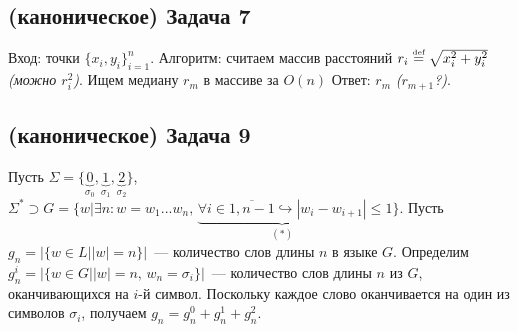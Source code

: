 \documentclass[a4paper]{article}
\def\eqdef{\overset{\mbox{\tiny def}}{=}}
\begin{document}
\subsection*{(каноническое) Задача 7}
Вход: точки $\{x_i,y_i\}_{i=1}^n$.\newline
Алгоритм: считаем массив расстояний $r_i\eqdef \sqrt{x_i^2+y_i^2}$ {\em (можно $r_i^2$)}. Ищем медиану $r_m$ в массиве за $O(n)$\newline
Ответ: $r_{m}$ {\em ($r_{m+1}$?)}.
\subsection*{(каноническое) Задача 9}
Пусть $\Sigma=\{\underbrace{0}_{\sigma_0},\underbrace{1}_{\sigma_1},\underbrace{2}_{\sigma_2}\}$, $\Sigma^*\supset G=\{w\big|\exists n\colon w=w_1...w_n,\,\underbrace{\forall i\in\overline{1,n-1}\hookrightarrow |w_i-w_{i+1}|}_{(*)}\leqslant 1\}$. Пусть $g_n=|\{w\in L\big||w|=n\}|$~--- количество слов длины $n$ в языке $G$. Определим $g^i_n=|\{w\in G\big||w|=n,\,w_n=\sigma_i\}|$~--- количество слов длины $n$ из $G$, оканчивающихся на $i$-й символ. Поскольку каждое слово оканчивается на один из символов $\sigma_i$, получаем $g_n=g_n^0+g_n^1+g_n^2$.
\end{document}
